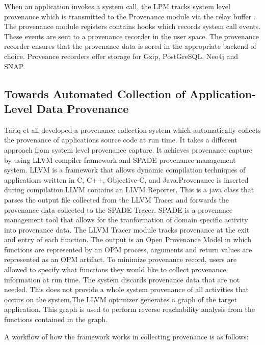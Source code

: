 \par When an application invokes a system call, the LPM tracks system level provenance which is transmitted to the Provenance module via the relay buffer . The provenance module registers contains hooks which records system call events. These events are sent to a provenance recorder in the user space. The provenance recorder ensures that the provenance data is sored in the appropriate backend of choice. Proveance recorders offer storage for Gzip, PostGreSQL, Neo4j and SNAP.



\subsection{Towards Automated Collection of Application-Level Data Provenance}
Tariq et all developed a provenance collection system which automatically collects the provenance of applications source code at run time. It takes a different approach from system level provenance capture. It achieves provenance capture by using LLVM compiler framework and SPADE provenance management system. LLVM is a framework that allows dynamic compilation techniques of applications written in C, C++, Objective-C, and Java.Provenance is inserted during compilation.LLVM contains an LLVM Reporter. This is a java class that parses the output file collected from the LLVM Tracer and forwards the provenance data collected to the SPADE Tracer. SPADE is a provenance management tool that allows for the tranformation of domain specific activity into provenance data. The LLVM Tracer module tracks provenance at the exit and entry of each function. The output is an Open Provenance Model in which functions are represented by an OPM process, arguments and return values are represented as an OPM artifact. To minimize provenance record, users are allowed to specify what functions they would like to collect provenance information at run time. The system discards provenance data that are not needed. This does not provide a whole system provenance of all activities that occurs on the system.The LLVM optimizer generates a graph of the target application. This graph is used to perform reverse reachability analysis  from the functions contained in the graph. 


A workflow of how the framework works in collecting provenance is as follows:

